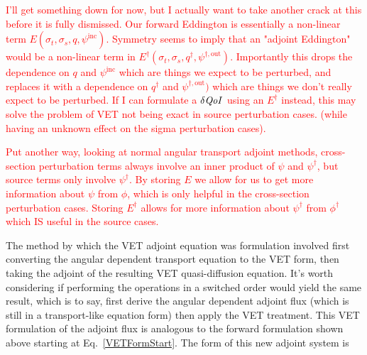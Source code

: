 \documentclass[12pt]{report}
\newcommand{\sigt}{\sigma_t}
\newcommand{\sigs}{\sigma_s}
\newcommand{\qoi}{{\it QoI}\xspace}
\newcommand{\comment}[2]{\marginpar{\textcolor{#2}{$\star$}}\textcolor{#2}{#1}\newline}
\newcommand{\iwh}[1]{\comment{#1}{red}}
\newcommand{\iwh}[1]{\phantom{a}}
\begin{document}
\iwh{I'll get something down for now, but I actually want to take another crack at this before it is fully dismissed. Our forward Eddington is essentially a non-linear term $E(\sigt,\sigs,q,\psi^{\text{inc}})$. Symmetry seems to imply that an "adjoint Eddington" would be a non-linear term in $E^\dag(\sigt,\sigs,q^\dag,\psi^{\dag,\text{out}})$. Importantly this drops the dependence on $q$ and $\psi^{\text{inc}}$ which are things we expect to be perturbed, and replaces it with a dependence on $q^\dag$ and $\psi^{\dag,\text{out}})$ which are things we don't really expect to be perturbed. If I can formulate a $\delta \qoi$ using an $E^\dag$ instead, this may solve the problem of VET not being exact in source perturbation cases. (while having an unknown effect on the sigma perturbation cases).}


\iwh{Put another way, looking at normal angular transport adjoint methods, cross-section perturbation terms always involve an inner product of $\psi$ and $\psi^\dag$, but source terms only involve $\psi^\dag$. By storing $E$ we allow for us to get more information about $\psi$ from $\phi$, which is only helpful in the cross-section perturbation cases. Storing $E^\dag$ allows for more information about $\psi^\dag$ from $\phi^\dag$ which IS useful in the source cases.}

The method by which the VET adjoint equation was formulation involved first converting the angular dependent transport equation to the VET form, then taking the adjoint of the resulting VET quasi-diffusion equation. It's worth considering if performing the operations in a switched order would yield the same result, which is to say, first derive the angular dependent adjoint flux (which is still in a transport-like equation form) then apply the VET treatment. This VET formulation of the adjoint flux is analogous to the forward formulation shown above starting at Eq.~\eqref{VETFormStart}. The form of this new adjoint system is
\end{document}
